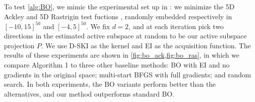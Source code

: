 To test \cref{alg:BO}, we mimic the experimental set up in 
\cite{wang2013bayesian}: we minimize the 5D Ackley and 5D Rastrigin test
fuctions \cite{sfutest2013}, randomly embedded respectively in $[-10, 15]^{50}$
and $[-4, 5]^{50}$. We fix $d=2$, and at each iteration pick two directions in
the estimated active subspace at random to be our active subspace projection
$P$. We use D\hyp{}SKI as the kernel and EI as the acquisition function. The
results of these experiments are shown in \cref{fig:bo_ack,fig:bo_ras}, in which
we compare Algorithm 1 to three other baseline methods: BO with EI and no
gradients in the original space; multi\hyp{}start BFGS with full gradients; and
random search. In both experiments, the BO variants perform better than the
alternatives, and our method outperforms standard BO.